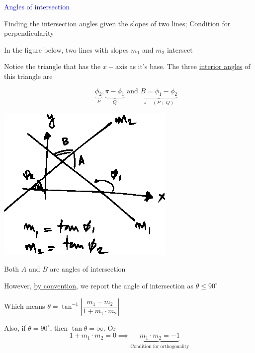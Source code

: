 \documentclass[14pt,fleqn]{extarticle}
\begin{document}
 
\begin{skill}
\textcolor{blue}{Angles of intersection}

Finding the intersection angles given the slopes of two lines; Condition for perpendicularity 
\end{skill}

\newcard 

In the figure below, two lines with slopes $m_1$ and $m_2$ intersect\newline 

Notice the triangle that has the $x-$axis as it's base. The three \underline{interior angles} of this triangle are 

\[\qquad \underbrace{\phi_2}_P,\underbrace{\pi-\phi_1}_Q\text{ and } \underbrace{B = \phi_1-\phi_2}_{\pi - (P+Q)} \]

\begin{center}
\includegraphics[scale=1.6]{figure.eps}
\end{center}

Both $A$ and $B$ are angles of intersection\newline 

However, \underline{by convention}, we report the angle of intersection as $\theta \leq 90^\circ$ \newline 

Which means $\theta = \tan^{-1}\left\vert \dfrac{m_1 - m_2}{1+m_1\cdot m_2}\right\vert$ \newline 

Also, if $\theta=90^\circ$, then $\tan\theta = \infty$. Or 
\[ 1 + m_1\cdot m_2 = 0 \implies \underbrace{m_1\cdot m_2 = -1}_{\text{Condition for orthogonality}} \]
\end{document}
